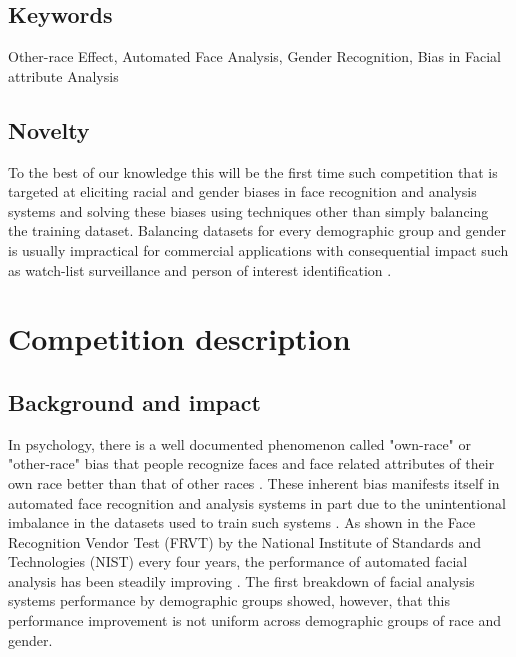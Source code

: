 \documentclass[11pt, oneside]{article}
\makeatletter
\let\@internalcite\cite
\def\cite{\def\citeauthoryear##1##2{##1, ##2}\@internalcite}
\makeatother
\begin{document}
\subsection{Keywords}
Other-race Effect, Automated Face Analysis, Gender Recognition, Bias in Facial attribute Analysis

\subsection{Novelty}
To the best of our knowledge this will be the first time such competition that is targeted at eliciting racial and gender biases in face recognition and analysis systems and solving these biases using techniques other than simply balancing the training dataset. Balancing datasets for every demographic group and gender is usually impractical for commercial applications with consequential impact such as watch-list surveillance \cite{kamgar2011toward} and person of interest identification \cite{best2014unconstrained}.

\section{Competition description}

\subsection{Background and impact}


In psychology, there is a well documented phenomenon called "own-race" or "other-race" bias that people recognize faces and face related attributes of their own race better than that of other races \cite{furl2002face}. These inherent bias manifests itself in automated face recognition and analysis systems in part due to the unintentional imbalance in the datasets used to train such systems \cite{phillips2011other}. As shown in the Face Recognition Vendor Test (FRVT) by the National Institute of Standards and Technologies (NIST)  every four years, the performance of automated facial analysis has been steadily improving \cite{grother2010report}. The first breakdown of facial analysis systems performance by demographic groups \cite{phillips2011other} showed, however, that this performance improvement is not uniform across demographic groups of race and gender.
\end{document}

